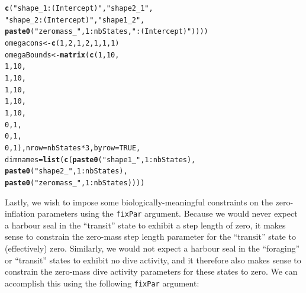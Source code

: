 \documentclass[12pt]{article}\usepackage[]{graphicx}\usepackage[]{color}
\makeatletter
\newcommand{\hlnum}[1]{\textcolor[rgb]{0.686,0.059,0.569}{#1}}%
\newcommand{\hlstr}[1]{\textcolor[rgb]{0.192,0.494,0.8}{#1}}%
\newcommand{\hlopt}[1]{\textcolor[rgb]{0,0,0}{#1}}%
\newcommand{\hlstd}[1]{\textcolor[rgb]{0.345,0.345,0.345}{#1}}%
\newcommand{\hlkwb}[1]{\textcolor[rgb]{0.69,0.353,0.396}{#1}}%
\newcommand{\hlkwc}[1]{\textcolor[rgb]{0.333,0.667,0.333}{#1}}%
\newcommand{\hlkwd}[1]{\textcolor[rgb]{0.737,0.353,0.396}{\textbf{#1}}}%
\newenvironment{kframe}{%
 \def\at@end@of@kframe{}%
 \ifinner\ifhmode%
  \def\at@end@of@kframe{\end{minipage}}%
  \begin{minipage}{\columnwidth}%
 \fi\fi%
 \def\FrameCommand##1{\hskip\@totalleftmargin \hskip-\fboxsep
 \colorbox{shadecolor}{##1}\hskip-\fboxsep
     \hskip-\linewidth \hskip-\@totalleftmargin \hskip\columnwidth}%
 \MakeFramed {\advance\hsize-\width
   \@totalleftmargin\z@ \linewidth\hsize
   \@setminipage}}%
 {\par\unskip\endMakeFramed%
 \at@end@of@kframe}
\newenvironment{knitrout}{}{} %
\makeatother
\begin{document}
\begin{knitrout}
\begin{kframe}
\begin{alltt}
                              \hlkwd{c}\hlstd{(}\hlstr{"shape_1:(Intercept)"}\hlstd{,}\hlstr{"shape2_1"}\hlstd{,}
                                \hlstr{"shape_2:(Intercept)"}\hlstd{,}\hlstr{"shape1_2"}\hlstd{,}
                                \hlkwd{paste0}\hlstd{(}\hlstr{"zeromass_"}\hlstd{,}\hlnum{1}\hlopt{:}\hlstd{nbStates,}\hlstr{":(Intercept)"}\hlstd{))))}
\hlstd{omegacons} \hlkwb{<-} \hlkwd{c}\hlstd{(}\hlnum{1}\hlstd{,}\hlnum{2}\hlstd{,}\hlnum{1}\hlstd{,}\hlnum{2}\hlstd{,}\hlnum{1}\hlstd{,}\hlnum{1}\hlstd{,}\hlnum{1}\hlstd{)}
\hlstd{omegaBounds} \hlkwb{<-} \hlkwd{matrix}\hlstd{(}\hlkwd{c}\hlstd{(}\hlnum{1}\hlstd{,}\hlnum{10}\hlstd{,}
                        \hlnum{1}\hlstd{,}\hlnum{10}\hlstd{,}
                        \hlnum{1}\hlstd{,}\hlnum{10}\hlstd{,}
                        \hlnum{1}\hlstd{,}\hlnum{10}\hlstd{,}
                        \hlnum{1}\hlstd{,}\hlnum{10}\hlstd{,}
                        \hlnum{1}\hlstd{,}\hlnum{10}\hlstd{,}
                        \hlnum{0}\hlstd{,}\hlnum{1}\hlstd{,}
                        \hlnum{0}\hlstd{,}\hlnum{1}\hlstd{,}
                        \hlnum{0}\hlstd{,}\hlnum{1}\hlstd{),}\hlkwc{nrow}\hlstd{=nbStates}\hlopt{*}\hlnum{3}\hlstd{,}\hlkwc{byrow}\hlstd{=}\hlnum{TRUE}\hlstd{,}
                    \hlkwc{dimnames}\hlstd{=}\hlkwd{list}\hlstd{(}\hlkwd{c}\hlstd{(}\hlkwd{paste0}\hlstd{(}\hlstr{"shape1_"}\hlstd{,}\hlnum{1}\hlopt{:}\hlstd{nbStates),}
                                    \hlkwd{paste0}\hlstd{(}\hlstr{"shape2_"}\hlstd{,}\hlnum{1}\hlopt{:}\hlstd{nbStates),}
                                    \hlkwd{paste0}\hlstd{(}\hlstr{"zeromass_"}\hlstd{,}\hlnum{1}\hlopt{:}\hlstd{nbStates))))}
\end{alltt}
\end{kframe}
\end{knitrout}
Lastly, we wish to impose some biologically-meaningful constraints on the zero-inflation parameters using the \verb|fixPar| argument. Because we would never expect a harbour seal in the ``transit'' state to exhibit a step length of zero, it makes sense to constrain the zero-mass step length parameter for the ``transit'' state to (effectively) zero.  Similarly, we would not expect a harbour seal in the ``foraging'' or ``transit'' states to exhibit no dive activity, and it therefore also makes sense to constrain the zero-mass dive activity parameters for these states to zero.  We can accomplish this using the following \verb|fixPar| argument:
\end{document}

